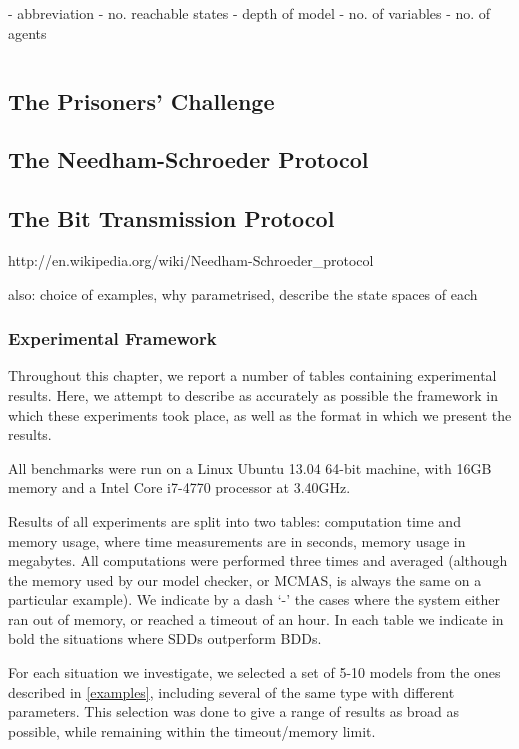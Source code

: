 \documentclass[11pt]{article}
\begin{document}
- abbreviation 
- no. reachable states
- depth of model 
- no. of variables 
- no. of agents 

\begin{tabular}{c}

\end{tabular}


\subsection*{The Prisoners' Challenge}



\subsection*{The Needham-Schroeder Protocol}

\subsection*{The Bit Transmission Protocol}

http://en.wikipedia.org/wiki/Needham-Schroeder\_protocol

also: choice of examples, why parametrised, describe the state spaces of each

\subsubsection{Experimental Framework} 

Throughout this chapter, we report a number of tables containing experimental results. Here, we attempt to describe as accurately as possible the framework in which these experiments took place, as well as the format in which we present the results. 

All benchmarks were run on a Linux Ubuntu 13.04 64-bit machine, with 16GB memory and a Intel Core i7-4770 processor at 3.40GHz. 

Results of all experiments are split into two tables: computation time and memory usage, where time measurements are in seconds, memory usage in megabytes. All computations were performed three times and averaged (although the memory used by our model checker, or MCMAS, is always the same on a particular example). We indicate by a dash `-' the cases where the system either ran out of memory, or reached a timeout of an hour. In each table we indicate in bold the situations where SDDs outperform BDDs.

For each situation we investigate, we selected a set of 5-10 models from the ones described in \ref{examples}, including several of the same type with different parameters. This selection was done to give a range of results as broad as possible, while remaining within the timeout/memory limit. 
\end{document}

